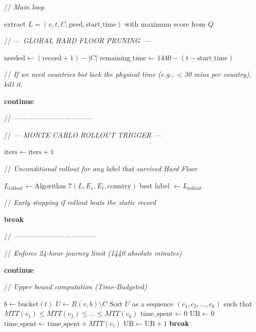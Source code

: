 \documentclass{article}
\newcommand{\CommentLine}[1]{
    \State // \textit{#1}
}
\begin{document}
\begin{algorithmic}[1]
    \vspace{0.5em}
    \CommentLine{Main loop}
        \State extract $L=(v,t,C,\text{pred},\text{start\_time})$ with maximum score from $Q$

        \vspace{0.5em}
        \CommentLine{--- GLOBAL HARD FLOOR PRUNING ---}
        \State $\text{needed} \leftarrow (\text{record} + 1) - |C|$
        \State $\text{remaining\_time} \leftarrow 1440 - (t - \text{start\_time})$
        \CommentLine{If we need countries but lack the physical time (e.g., < 30 mins per country), kill it.}
            \State \textbf{continue}
        \EndIf
        \CommentLine{---------------------------------}

        \vspace{0.5em}
        \CommentLine{--- MONTE CARLO ROLLOUT TRIGGER ---}
        \State $\text{iters} \leftarrow \text{iters} + 1$
            \CommentLine{Unconditional rollout for any label that survived Hard Floor}
            \State $L_{\text{rollout}} \leftarrow \text{Algorithm 7}(L,E_s,E_t,\text{country})$
                \State best label $\leftarrow L_{\text{rollout}}$
            \EndIf
            \CommentLine{Early stopping if rollout beats the static record}
                \State \textbf{break}
            \EndIf
        \EndIf
        \CommentLine{----------------------------------}

        \vspace{0.5em}
        \CommentLine{Enforce 24-hour journey limit (1440 absolute minutes)}
            \State \textbf{continue}
        \EndIf

        \vspace{0.5em}
        \CommentLine{Upper bound computation (Time-Budgeted)}
        \State $b \leftarrow \text{bucket}(t)$
        \State $U \leftarrow R(v,b) \setminus C$
        \State Sort $U$ as a sequence $(c_1, c_2, \ldots, c_k)$ such that $MTT(c_1) \le MTT(c_2) \le \ldots \le MTT(c_k)$
        \State $\text{time\_spent} \leftarrow 0$
        \State $\text{UB} \leftarrow 0$
            \State $\text{time\_spent} \leftarrow \text{time\_spent} + MTT(c_i)$
                \State $\text{UB} \leftarrow \text{UB} + 1$
            \Else
                \State \textbf{break}
            \EndIf
        \EndFor


\end{algorithmic}
\end{document}

